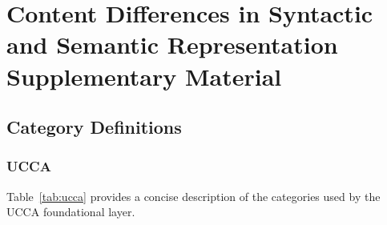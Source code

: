 %

\chapter{Content Differences in Syntactic and Semantic Representation \\ Supplementary Material}

\section{Category Definitions}\label{sec:definitions}

\subsection{UCCA}

Table~\ref{tab:ucca} provides a concise description of the
categories used by the UCCA foundational layer.

